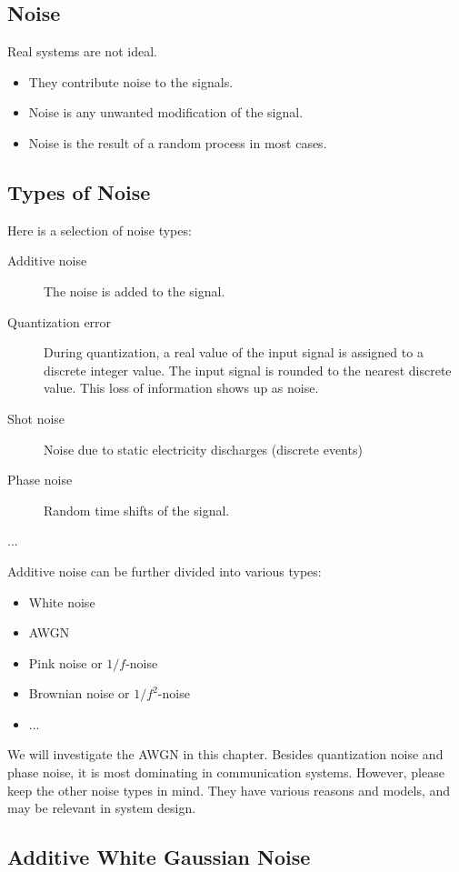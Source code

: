 \begin{refsection}
\section{Noise}

Real systems are not ideal.
\begin{itemize}
	\item They contribute noise to the signals.
	\item Noise is any unwanted modification of the signal.
	\item Noise is the result of a random process in most cases.
\end{itemize} 

\subsection{Types of Noise}

Here is a selection of  noise types:
\begin{description}
	\item[Additive noise] The noise is added to the signal.
	\item[Quantization error] During quantization, a real value of the input signal is assigned to a discrete integer value. The input signal is rounded to the nearest discrete value. This loss of information shows up as noise.
	\item[Shot noise] Noise due to static electricity discharges (discrete events)
	\item[Phase noise] Random time shifts of the signal.
	\item[...]
\end{description}

Additive noise can be further divided into various types:
\begin{itemize}
	\item White noise
	\item \ac{AWGN}
	\item Pink noise or $1/f$-noise
	\item Brownian noise or $1/f^2$-noise
	\item ...
\end{itemize}

We will investigate the \ac{AWGN} in this chapter. Besides quantization noise and phase noise, it is most dominating in communication systems. However, please keep the other noise types in mind. They have various reasons and models, and may be relevant in system design.

\subsection{Additive White Gaussian Noise}


\end{refsection}
